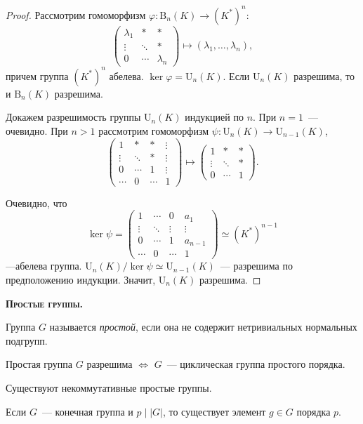 \documentclass[a4paper]{article}
\newcommand*{\tema}[1]{\vspace{20pt}
\begin{center}{\textbf{\textsc{#1.}}}\vspace{5pt}
\end{center}}
\begin{document}
\begin{proof}
Рассмотрим гомоморфизм $\varphi\colon \mathrm{B}_n(K)\to (K^*)^n$:
$$
\begin{pmatrix}
\lambda_1 &* &* \\
\vdots& \ddots & *\\
0&\cdots & \lambda_n
\end{pmatrix}\mapsto (\lambda_1,\ldots,\lambda_n),
$$
причем группа $(K^*)^n$ абелева. $\ker\varphi=\mathrm{U}_n(K)$. Если
$\mathrm{U}_n(K)$ разрешима, то и $\mathrm{B}_n(K)$ разрешима.

Докажем разрешимость группы $\mathrm{U}_n(K)$ индукцией по $n$. При
$n=1$~--- очевидно. При $n>1$ рассмотрим гомоморфизм $\psi\colon
\mathrm{U}_n(K)\to \mathrm{U}_{n-1}(K)$,
$$
\begin{pmatrix}
1 &* &* &\vdots\\
\vdots& \ddots & *&\vdots\\
0&\cdots & 1&\vdots\\
\cdots& 0 &\cdots & 1
\end{pmatrix}\mapsto
\begin{pmatrix}
1 &* &* \\
\vdots& \ddots & *\\
0&\cdots & 1
\end{pmatrix}.$$

Очевидно, что
$$\ker\psi=
\begin{pmatrix}
1 &\cdots &0 &a_1\\
\vdots& \ddots & \vdots&\vdots\\
0&\cdots & 1&a_{n-1}\\
\cdots& 0 &\cdots & 1
\end{pmatrix}\simeq (K^*)^{n-1}
$$
---абелева группа. $\mathrm{U}_n(K)/\ker\psi\simeq \mathrm{U}_{n-1}(K)$~--- разрешима
по предположению индукции. Значит, $\mathrm{U}_n(K)$ разрешима.
\end{proof}

\tema{Простые группы}

Группа $G$ называется \emph{простой}, если она не содержит
нетривиальных нормальных подгрупп.

Простая группа $G$ разрешима $\Leftrightarrow$ $G$~--- циклическая
группа простого порядка.

Существуют некоммутативные простые группы.

\begin{lemm}
\label{1.X}Если $G$~--- конечная группа и $p\mid|G|$, то существует
элемент $g\in G$ порядка $p$.
\end{lemm}
\end{document}
